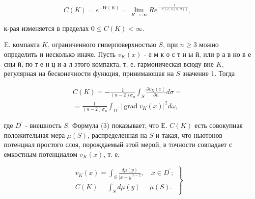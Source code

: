 \documentclass[10pt]{article}
\begin{document}
\[

C(K)=e^{-W(K)}=\lim _{R \rightarrow \infty} R e^{-\frac{1}{C(L, S(0, R))}},

\]



к-рая изменяется в пределах $0 \leqslant C(K)<\infty$.



E. компакта $K$, ограниченного гиперповерхностью $S$, при $n \geqslant 3$ можно определить и несколько иначе. Пусть $v_{K}(x)$ - е м к о с т н ы й, или р а в но в е сны й, по т е н ц и а л этого компакта, т. е. гармоническая всюду вне $K$, регулярная на бесконечности функция, принимающая на $S$ значение 1. Тогда



\[

\begin{gathered}

C(K)=-\frac{1}{(n-2) \sigma_{n}} \int_{S} \frac{\partial v_{K}(x)}{\partial n} d \sigma= \\

=\frac{1}{(n-2) \sigma_{n}} \int_{D^{\prime}}\left|\operatorname{grad} v_{K}(x)\right|^{2} d \omega,

\end{gathered}

\]



где $D^{\prime}$ - внешность $S$. Формула (3) показывает, что Е. $C(K)$ есть совокупная положительная мера $\mu(S)$, распределенная на $S$ и такая, что ньютонов потенциал простого слоя, порождаемый этой мерой, в точности совпадает с емкостным потенциалом $v_{K}(x)$, т. е.



\[

\left.\begin{array}{l}

v_{K}(x)=\int_{S} \frac{d \mu(y)}{|x-y|^{n-2}}, \quad x \in D^{\prime} ; \\

C(K)=\int_{S} d \mu(y)=\mu(S) .

\end{array}\right\}

\]
\end{document}
